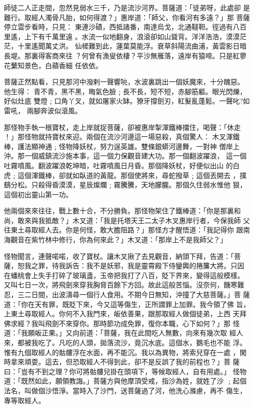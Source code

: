\begin{pinyinscope}
{師徒二人正走間，忽然見弱水三千，乃是流沙河界。菩薩道：「徒弟呀，此處卻
是難行。取經人濁骨凡胎，如何得渡？」惠岸道：「師父，你看河有多遠？」那
菩薩停立雲步看時，只見：
東連沙磧，西抵諸番，南達烏戈，北通韃靼。徑過有八百里遙，上下有千萬里遠
。水流一似地翻身，浪滾卻如山聳背。洋洋浩浩，漠漠茫茫，十里遙聞萬丈洪。
仙槎難到此，蓮葉莫能浮。衰草斜陽流曲浦，黃雲影日暗長堤。那裏得客商來往
？何曾有漁叟依棲？平沙無雁落，遠岸有猿啼。只是紅蓼花蘩知景色，白蘋香細
任依依。

菩薩正然點看，只見那河中潑剌一聲響喨，水波裏跳出一個妖魔來，十分醜惡。
他生得：
青不青，黑不黑，晦氣色臉﹔長不長，短不短，赤腳筋軀。眼光閃爍，好似灶底
雙燈﹔口角丫叉，就如屠家火缽。獠牙撐劍刃，紅髮亂蓬鬆。一聲叱?如雷吼，
兩腳奔波似滾風。

那怪物手執一根寶杖，走上岸就捉菩薩，卻被惠岸掣渾鐵棒擋住，喝聲：「休走
！」那怪物就持寶杖來迎。兩個在流沙河邊這一場惡殺，真個驚人：
木叉渾鐵棒，護法顯神通﹔怪物降妖杖，努力逞英雄。雙條銀蟒河邊舞，一對神
僧岸上沖。那一個威鎮流沙施本事，這一個力保觀音建大功。那一個翻波躍浪，
這一個吐霧噴風。翻波躍浪乾坤暗，吐霧噴風日月昏。那個降妖杖，好便似出山
的白虎﹔這個渾鐵棒，卻就如臥道的黃龍。那個使將來，尋蛇撥草﹔這個丟開去
，撲鷂分松。只殺得昏漠漠，星辰燦爛﹔霧騰騰，天地朦朧。那個久住弱水惟他
狠，這個初出靈山第一功。

他兩個來來往往，戰上數十合，不分勝負。那怪物架住了鐵棒道：「你是那裏和
尚，敢來與我抵敵？」木叉道：「我是托塔天王二太子木叉惠岸行者，今保我師
父往東土尋取經人去。你是何怪，敢大膽阻路？」那怪方才醒悟道：「我記得你
跟南海觀音在紫竹林中修行，你為何來此？」木叉道：「那岸上不是我師父？」

怪物聞言，連聲喏喏，收了寶杖。讓木叉揪了去見觀音，納頭下拜，告道：「菩
薩，恕我之罪，待我訴告：我不是妖邪，我是靈霄殿下侍鑾輿的捲簾大將。只因
在蟠桃會上失手打碎了玻璃盞，玉帝把我打了八百，貶下界來，變得這般模樣。
又叫七日一次，將飛劍來穿我胸脅百餘下方回。故此這般苦惱。沒奈何，饑寒難
忍，三二日間，出波濤尋一個行人食用。不期今日無知，沖撞了大慈菩薩。」菩
薩道：「你在天有罪，既貶下來，今又這等傷生，正所謂罪上加罪。我今領了佛
旨，上東土尋取經人。你何不入我門來，皈依善果，跟那取經人做個徒弟，上西
天拜佛求經？我叫飛劍不來穿你。那時節功成免罪，復你本職，心下如何？」那
怪道：「我願皈正果。」又向前道：「菩薩，我在此間吃人無數，向來有幾次取
經人來，都被我吃了。凡吃的人頭，拋落流沙，竟沉水底。這個水，鵝毛也不能
浮。惟有九個取經人的骷髏浮在水面，再不能沉。我以為異物，將索兒穿在一處
，閑時拿來頑耍。這去，但恐取經人不得到此，卻不是反誤了我的前程也？」菩
薩曰：「豈有不到之理？你可將骷髏兒掛在頭項下，等候取經人，自有用處。」
怪物道：「既然如此，願領教誨。」菩薩方與他摩頂受戒，指沙為姓，就姓了沙
﹔起個法名，叫做個沙悟淨。當時入了沙門，送菩薩過了河，他洗心滌慮，再不
傷生，專等取經人。

}
\end{pinyinscope}
